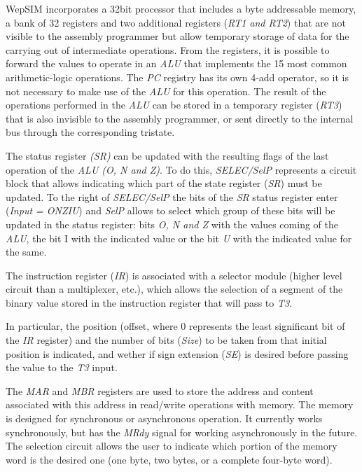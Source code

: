 WepSIM incorporates a 32bit processor that includes a byte addressable memory,  a bank of 32 registers and two additional registers (\emph{RT1 and RT2}) that are not visible to the assembly programmer but allow temporary storage of data for the carrying out of intermediate operations. From the registers, it is possible to forward the values to operate in an \emph{ALU} that implements the 15 most common arithmetic-logic operations. The \emph{PC} registry has its own 4-add operator, so it is not necessary to make use of the \emph{ALU} for this operation. The result of the operations performed in the \emph{ALU} can be stored in a temporary register (\emph{RT3}) that is also invisible to the assembly programmer, or sent directly to the internal bus through the corresponding tristate.


The status register \emph{(SR)} can be updated with the resulting flags of the last operation of the \emph{ALU (O, N and Z)}. To do this, \emph{SELEC/SelP} represents a circuit block that allows indicating which part of the state register (\emph{SR}) must be updated. To the right of \emph{SELEC/SelP} the bits of the \emph{SR} status register enter (\emph{Input = ONZIU}) and \emph{SelP} allows to select which group of these bits will be updated in the status register: bits \emph{O, N and Z} with the values coming of the \emph{ALU}, the bit I with the indicated value or the bit \emph{U} with the indicated value for the same.

The instruction register (\emph{IR}) is associated with a selector module (higher level circuit than a multiplexer, etc.), which allows the selection of a segment of the binary value stored in the instruction register that will pass to \emph{T3}.

In particular, the position (offset, where 0 represents the least significant bit of the \emph{IR} register) and the number of bits (\emph{Size}) to be taken from that initial position is indicated, and wether if sign extension (\emph{SE}) is desired before passing the value to the \emph{T3} input.

The \emph{MAR} and \emph{MBR} registers are used to store the address and content associated with this address in read/write operations with memory. The memory is designed for synchronous or asynchronous operation. It currently works synchronously, but has the \emph{MRdy} signal for working asynchronously in the future. The selection circuit allows the user to indicate which portion of the memory word is the desired one (one byte, two bytes, or a complete four-byte word).

